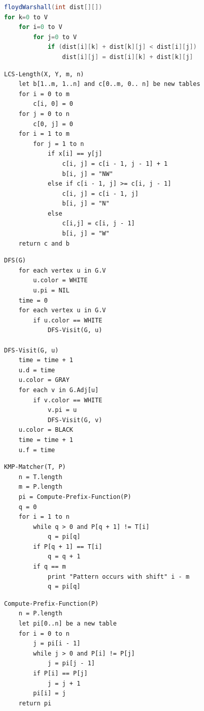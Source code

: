 \documentclass{article}
\begin{document}
\begin{multicols*}{2}


    \begin{lstlisting}[language=java]
floydWarshall(int dist[][])
for k=0 to V
    for i=0 to V
        for j=0 to V
            if (dist[i][k] + dist[k][j] < dist[i][j])
                dist[i][j] = dist[i][k] + dist[k][j]
\end{lstlisting}

    \begin{lstlisting}
LCS-Length(X, Y, m, n)
    let b[1..m, 1..n] and c[0..m, 0.. n] be new tables
    for i = 0 to m
        c[i, 0] = 0
    for j = 0 to n
        c[0, j] = 0
    for i = 1 to m
        for j = 1 to n
            if x[i] == y[j]
                c[i, j] = c[i - 1, j - 1] + 1
                b[i, j] = "NW"
            else if c[i - 1, j] >= c[i, j - 1]
                c[i, j] = c[i - 1, j]
                b[i, j] = "N"
            else
                c[i,j] = c[i, j - 1]
                b[i, j] = "W"
    return c and b
\end{lstlisting}


    \begin{lstlisting}
DFS(G)
    for each vertex u in G.V
        u.color = WHITE
        u.pi = NIL
    time = 0
    for each vertex u in G.V
        if u.color == WHITE
            DFS-Visit(G, u)

DFS-Visit(G, u)
    time = time + 1
    u.d = time
    u.color = GRAY
    for each v in G.Adj[u]
        if v.color == WHITE
            v.pi = u
            DFS-Visit(G, v)
    u.color = BLACK
    time = time + 1
    u.f = time
\end{lstlisting}

    \begin{lstlisting}
KMP-Matcher(T, P)
    n = T.length
    m = P.length
    pi = Compute-Prefix-Function(P)
    q = 0
    for i = 1 to n
        while q > 0 and P[q + 1] != T[i]
            q = pi[q]
        if P[q + 1] == T[i]
            q = q + 1
        if q == m
            print "Pattern occurs with shift" i - m
            q = pi[q]
    \end{lstlisting}
    \columnbreak
    \vspace*{-12em}
    \begin{lstlisting}
Compute-Prefix-Function(P)
    n = P.length
    let pi[0..n] be a new table
    for i = 0 to n
        j = pi[i - 1]
        while j > 0 and P[i] != P[j]
            j = pi[j - 1]
        if P[i] == P[j]
            j = j + 1
        pi[i] = j
    return pi
\end{lstlisting}


\end{multicols*}
\end{document}
